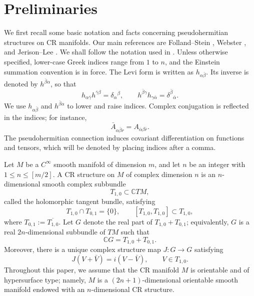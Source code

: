\documentclass[11pt]{article}
\numberwithin{equation}{section}
\numberwithin{equation}{section}
\begin{document}
	\section{Preliminaries}\label{sectionpreliminary}
	We first recall some basic notation and facts concerning pseudohermitian structures on CR manifolds. Our main references are Folland--Stein \cite{FS1974}, Webster \cite{W1978}, and Jerison--Lee \cite{JL1989}. We shall follow the notation used in \cite{W1978}. Unless otherwise specified, lower-case Greek indices range from \(1\) to \(n\), and the Einstein summation convention is in force. The Levi form is written as \(h_{\alpha\bar\beta}\). Its inverse is denoted by \(h^{\bar\beta\alpha}\), so that
	\[
	h_{\alpha\bar\gamma}h^{\bar\gamma\beta}=\delta_\alpha{}^\beta, \qquad h^{\bar\beta\gamma}h_{\gamma\bar\alpha}=\delta^{\bar\beta}{}_{\bar\alpha}.
	\]
	We use \(h_{\alpha\bar\beta}\) and \(h^{\bar\beta\alpha}\) to lower and raise indices. Complex conjugation is reflected in the indices; for instance,
	\[
	\bar{A}_{\alpha\bar{\beta} r}=A_{\bar{\alpha}\beta\bar{r}}.
	\]
	The pseudohermitian connection induces covariant differentiation on functions and tensors, which will be denoted by placing indices after a comma.
	
	Let \(M\) be a \(C^\infty\) smooth manifold of dimension \(m\), and let \(n\) be an integer with \(1\le n\le [m/2]\). A CR structure on \(M\) of complex dimension \(n\) is an \(n\)-dimensional smooth complex subbundle
	\[
	T_{1,0}\subset \mathbb{C}TM,
	\]
	called the holomorphic tangent bundle, satisfying
	\[
	T_{1,0}\cap T_{0,1}=\{0\}, \qquad [T_{1,0},T_{1,0}]\subset T_{1,0},
	\]
	where \(T_{0,1}:=\overline{T_{1,0}}\). Let \(G\) denote the real part of \(T_{1,0}+T_{0,1}\); equivalently, \(G\) is a real \(2n\)-dimensional subbundle of \(TM\) such that
	\[
	\mathbb{C}G=T_{1,0}+T_{0,1}.
	\]
	Moreover, there is a unique complex structure map \(J:G\to G\) satisfying
	\[
	J(V+\bar V)=i(V-\bar V), \qquad V\in T_{1,0}.
	\]
	Throughout this paper, we assume that the CR manifold \(M\) is orientable and of hypersurface type; namely, \(M\) is a \((2n+1)\)-dimensional orientable smooth manifold endowed with an \(n\)-dimensional CR structure.
	
\end{document}
